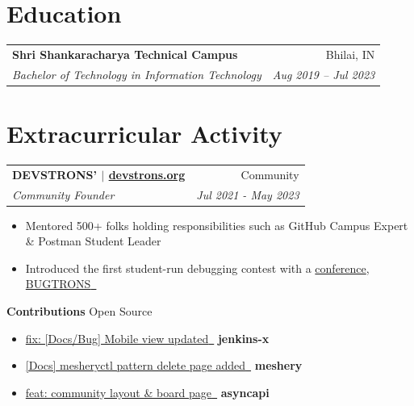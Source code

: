 \documentclass[letterpaper, 10pt]{article}
\makeatletter
\newcommand{\resumeItem}[2]{ \item\small{ \textbf{#1}{#2 \vspace{-4pt}} } }
\newcommand{\resumeSubHeading}[4]{
\vspace{-1pt}
\begin{tabular*}{\textwidth}{l@{\extracolsep{\fill}}r}
	\textbf{#1}       & #2                 \\
	\textit{\small#3} & \textit{\small #4} \\
\end{tabular*}
\vspace{-5pt}
}
\newcommand{\resumeItemListStart}{\begin{itemize}}
\newcommand{\resumeItemListEnd}{\end{itemize}
\vspace{-5pt}}
\makeatother
\begin{document}
	\section{Education}
	\resumeSubHeading {Shri Shankaracharya Technical Campus}{Bhilai, IN}
	{Bachelor of Technology in Information Technology}{Aug 2019 -- Jul 2023}
	\vspace{-4pt}

	\section{Extracurricular Activity}
	\resumeSubHeading {DEVSTRONS' $|$ \href{https://devstrons.org}{devstrons.org}}{Community}
	{Community Founder}{Jul 2021 - May 2023} \resumeItemListStart \resumeItem{}{Mentored 500+ folks holding responsibilities such as GitHub Campus Expert \& Postman Student Leader}
	\resumeItem{}{Introduced the first student-run debugging contest with a \href{https://bit.ly/bugtrons2-con}{conference}, \href{https://bugtrons.netlify.app}{{BUGTRONS} \,\faExternalLink}}
	\resumeItemListEnd
	\vspace{6pt}

	\textbf{Contributions}{}
	\vspace{-7pt}
	\hfill \textbf{}{Open Source} \resumeItemListStart
	\vspace{4pt}
	\resumeItem{}{ \href{https://github.com/jenkins-x/jx-docs/pull/3381}{{fix: [Docs/Bug] Mobile view updated} \,\faExternalLink} \hfill \textbf{jenkins-x} }
	\resumeItem{}{ \href{https://github.com/meshery/meshery/pull/3070}{{[Docs] mesheryctl pattern delete page added} \,\faExternalLink} \hfill \textbf{meshery} }
	\resumeItem{}{ \href{https://github.com/asyncapi/website/pull/4127}{{feat: community layout \& board page} \,\faExternalLink} \hfill \textbf{asyncapi} }
	\resumeItemListEnd

\end{document}
